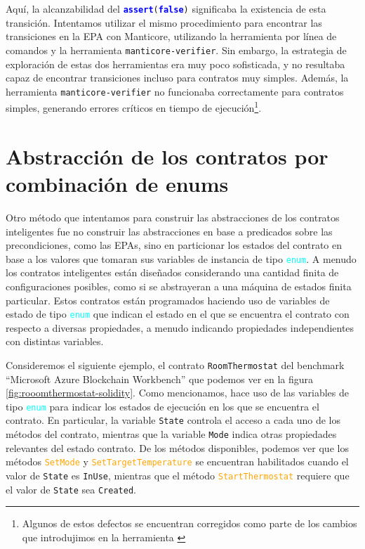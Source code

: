 Aquí, la alcanzabilidad del \texttt{\textcolor{blue}{\textbf{assert}}(\textcolor{blue}{\textbf{false}})} significaba la existencia de esta transición.
Intentamos utilizar el mismo procedimiento para encontrar las transiciones en la EPA con Manticore, utilizando la herramienta por línea de comandos y la herramienta \texttt{manticore-verifier}.
Sin embargo, la estrategia de exploración de estas dos herramientas era muy poco sofisticada, y no resultaba capaz de encontrar transiciones incluso para contratos muy simples.
Además, la herramienta \texttt{manticore-verifier} no funcionaba correctamente para contratos simples, generando errores críticos en tiempo de ejecución\footnote{Algunos de estos defectos se encuentran corregidos como parte de los cambios que introdujimos en la herramienta \cite{manticore-tiny-changes}}.

\section{Abstracción de los contratos por combinación de enums}
Otro método que intentamos para construir las abstracciones de los contratos inteligentes fue no construir las abstracciones en base a predicados sobre las precondiciones, como las EPAs, sino en particionar los estados del contrato en base a los valores que tomaran sus variables de instancia de tipo \textcolor{cyan}{\texttt{enum}}.
A menudo los contratos inteligentes están diseñados considerando una cantidad finita de configuraciones posibles, como si se abstrayeran a una máquina de estados finita particular.
Estos contratos están programados haciendo uso de variables de estado de tipo \textcolor{cyan}{\texttt{enum}} que indican el estado en el que se encuentra el contrato con respecto a diversas propiedades, a menudo indicando propiedades independientes con distintas variables.

Consideremos el siguiente ejemplo, el contrato \texttt{RoomThermostat} del benchmark ``Microsoft Azure Blockchain Workbench'' \cite{azure-benchmark} que podemos ver en la figura \ref{fig:rooomthermostat-solidity}.
Como mencionamos, hace uso de las variables de tipo \textcolor{cyan}{\texttt{enum}} para indicar los estados de ejecución en los que se encuentra el contrato.
En particular, la variable \texttt{State} controla el acceso a cada uno de los métodos del contrato, mientras que la variable \texttt{Mode} indica otras propiedades relevantes del estado contrato.
De los métodos disponibles, podemos ver que los métodos \textcolor{orange}{\texttt{SetMode}} y \textcolor{orange}{\texttt{SetTargetTemperature}} se encuentran habilitados cuando el valor de \texttt{State} es \texttt{InUse}, mientras que el método \textcolor{orange}{\texttt{StartThermostat}} requiere que el valor de \texttt{State} sea \texttt{Created}.


